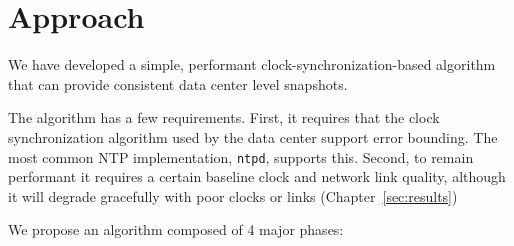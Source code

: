 \chapter{Approach}
\label{sec:approach}

We have developed a simple, performant clock-synchronization-based
algorithm that can provide consistent data center level snapshots.

The algorithm has a few requirements. First, it requires that the
clock synchronization algorithm used by the data center support error
bounding. The most common NTP implementation, \texttt{ntpd}, supports
this. Second, to remain performant it requires a certain baseline
clock and network link quality, although it will degrade gracefully
with poor clocks or links (Chapter~\ref{sec:results})

We propose an algorithm composed of 4 major phases:

